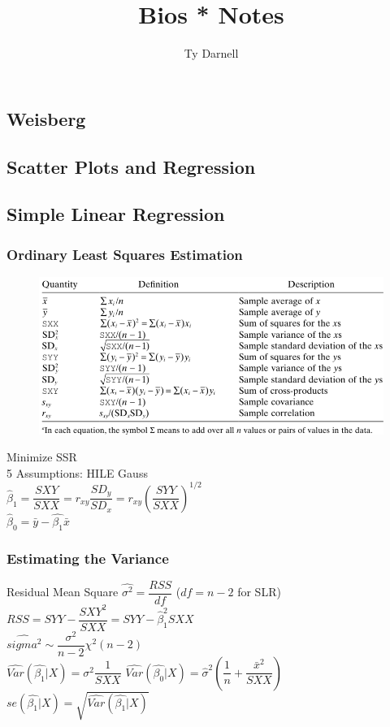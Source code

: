 \documentclass[openany]{book}
\title{Bios * Notes}
\author{Ty Darnell}
\date{ }
\newcommand{\B}{\beta}
\numberwithin{equation}{section}
\begin{document}
	\tableofcontents
\begin{flushleft}
\part{Weisberg}
\chapter{Scatter Plots and Regression}
\chapter{Simple Linear Regression}
\section{Ordinary Least Squares Estimation}
\begin{figure}[H]
\includegraphics[scale=.6]{olsdefn.png}\\
\end{figure}
Minimize SSR\\
5 Assumptions: HILE Gauss\\
$\hat{\B}_1=\dfrac{SXY}{SXX}=r_{xy}\dfrac{SD_y}{SD_x}=r_{xy}\left(\dfrac{SYY}{SXX}\right)^{1/2}$\\
$\hat{\B}_0=\bar{y}-\hat{\B_1}\bar{x}$
\section{Estimating the Variance}
Residual Mean Square $\hat{\sigma^2}=\dfrac{RSS}{df}$  ($df=n-2$ for SLR)\\
$RSS=SYY-\dfrac{{SXY}^2}{SXX}=SYY-\hat{\B}_1^2SXX$\\
$\hat{sigma^2}\sim \dfrac{\sigma^2}{n-2}\chi^2(n-2)$\\
$\hat{Var}(\hat{\B_1}|X)=\hat{\sigma^2}\dfrac{1}{SXX}$
$\hat{Var}(\hat{\B_0}|X)=\hat{\sigma}^2\left(\dfrac{1}{n}+ \dfrac{\bar{x}^2}{SXX}\right)$\\
$se(\hat{\B_1}|X)=\sqrt{\hat{Var}(\hat{\B_1}|X)}$\\

\end{flushleft}
\end{document}
